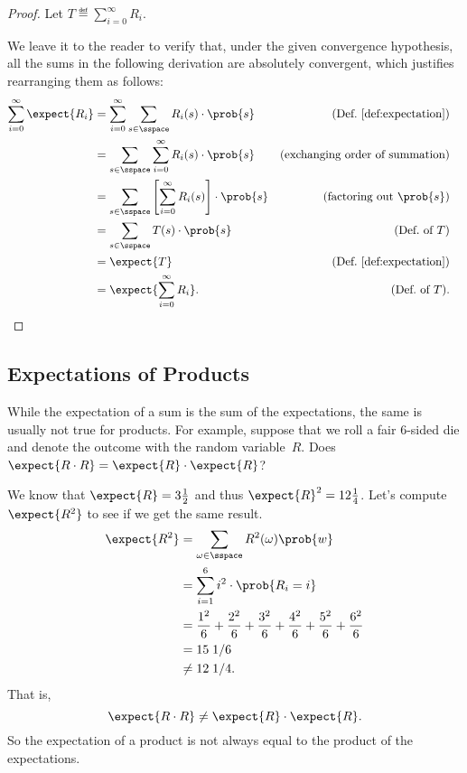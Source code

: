 \begin{proof}
Let $T \eqdef \sum_{i = 0}^\infty R_i$.

We leave it to the reader to verify that, under the given convergence
hypothesis, all the sums in the following derivation are absolutely
convergent, which justifies rearranging them as follows:
\begin{align*}
\sum_{i=0}^\infty \expect{R_i}
    &= \sum_{i=0}^\infty \sum_{s \in \sspace} R_i(s) \cdot \prob{s}
            & \text{(Def.~\ref{def:expectation})}\\
    &= \sum_{s \in \sspace} \sum_{i=0}^\infty R_i(s) \cdot \prob{s}
           & \text{(exchanging order of summation)}\\
    &= \sum_{s \in \sspace} \left[ \sum_{i=0}^\infty R_i(s) \right] \cdot \prob{s}
                & \text{(factoring out $\prob{s}$)}\\
    &= \sum_{s \in \sspace} T(s) \cdot \prob{s} & \text{(Def.\ of $T$)}\\
    &= \expect{T} & \text{(Def.~\ref{def:expectation})}\\
    &= \expect{\sum_{i = 0}^\infty R_i}. &  \text{(Def.\ of $T$)}. &\qedhere
\end{align*}
\end{proof}

\subsection{Expectations of Products}

While the expectation of a sum is the sum of the expectations, the same is
usually not true for products.  For example, suppose that we roll a
fair 6-sided die and denote the outcome with the random variable~$R$.
Does $\expect{R \cdot R} = \expect{R} \cdot \expect{R}$?

We know that $\expect{R} = 3\frac{1}{2}$ and thus $\expect{R}^2 =
12\frac{1}{4}$.  Let's compute~$\expect{R^2}$ to see if we get the same
result.
\begin{align*}
\expect{R^2}
    & = \sum_{\omega \in \sspace} R^2(\omega) \prob{w} \\
    & = \sum_{i=1}^6 i^2 \cdot \prob{R_i = i} \\
    & = \frac{1^2}{6} + \frac{2^2}{6} + \frac{3^2}{6} +
            \frac{4^2}{6} + \frac{5^2}{6} + \frac{6^2}{6} \\
    & =   15\; 1/6\\
    & \neq  12 \; 1/4.
\end{align*}
That is,
\[
    \expect{R \cdot R} \neq \expect{R} \cdot \expect{R}.
\]
So the expectation of a product is not always equal to the product of
the expectations.


